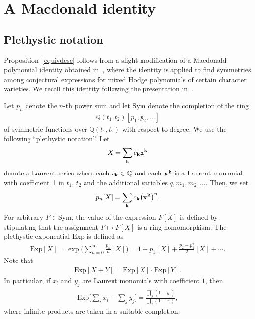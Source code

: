 \documentclass[pdftex]{sigma}
\numberwithin{equation}{section}
\newcommand{\Sym}{\mathrm{Sym}}
\newcommand{\Exp}{\mathrm{Exp}}
\def\Q{\mathbb Q}
\begin{document}
\section{A Macdonald identity}\label{equivproof}


\subsection{Plethystic notation}\label{Macdonald}


Proposition~\ref{equivdesc} follows from a slight modification of a Macdonald polynomial identity obtained in~\cite[Section~7]{M}, where the identity is applied to find symmetries among conjectural expressions for mixed Hodge polynomials of certain character varieties. We recall this identity following the presentation in~\cite{M}.

Let $p_n$ denote the $n$-th power sum and let $\Sym$ denote the completion of the ring
\begin{gather*}
\Q(t_1,t_2)[p_1,p_2,\ldots]
\end{gather*}
of symmetric functions over $\Q(t_1,t_2)$ with respect to degree. We use the following ``plethystic notation''. Let
\begin{gather*}
X=\sum_{{\bf k}} c_{\bf k} {\bf x}^{\bf k}
\end{gather*}
denote a Laurent series where each $c_{\bf k}\in \Q$ and each ${\bf x}^{\bf k}$ is a Laurent monomial with coefficient~1 in $t_1$, $t_2$ and the additional variables $q, m_1,m_2,\dots$. Then, we set
\begin{gather*}
p_n[X]=\sum_{{\bf k}} c_{\bf k} \big({\bf x}^{\bf k}\big)^n.
\end{gather*}
For arbitrary $F\in \Sym$, the value of the expression $F[X]$ is defined by stipulating that the assignment $F\mapsto F[X]$ is a ring homomorphism. The plethystic exponential $\Exp$ is defined as \begin{align}\label{expdef}
\Exp[X]=\exp\bigg(\sum_{n=0}^{\infty} \frac{p_n}{n}[X]\bigg)=1+p_1[X]+\frac{p_2+p_1^2}{2}[X]+\cdots.
\end{align}
Note that
\begin{gather*}
\Exp[X+Y]=\Exp[X]\cdot \Exp[Y].
\end{gather*}
In particular, if $x_i$ and $y_j$ are Laurent monomials with coefficient $1$, then
\begin{gather*}
\Exp\bigg[\sum_{i} x_i-\sum_{j} y_j \bigg]= \frac{\prod_{j}(1-y_j)}{\prod_{i}(1-x_i)},
\end{gather*}
where infinite products are taken in a suitable completion.
\end{document}
